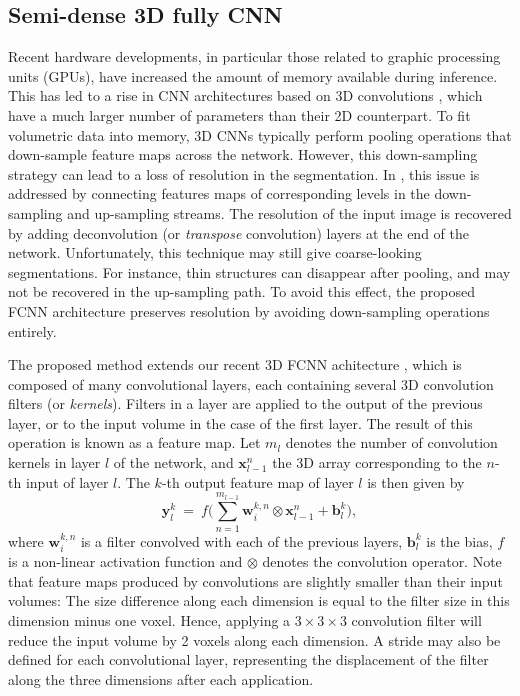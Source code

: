 \documentclass[twoside,espcrc2]{elsarticle}
\newcommand{\vold}[1]{$#1\!\times\!#1\!\times\!#1$}
\renewcommand{\vec}[1]{\mathbf{#1}}
\newcommand{\xx}{\vec x}
\newcommand{\yy}{\vec y}
\newcommand{\bb}{\vec b}
\newcommand{\WW}{\vec w}
\begin{document}
\subsection{Semi-dense 3D fully CNN}
\label{ssec:semi-dense}


Recent hardware developments, in particular those related to graphic processing units (GPUs), have increased the amount of memory available during inference. This has led to a rise in CNN architectures based on 3D convolutions \cite{kamnitsas2017efficient,dou20163d,milletari2016v,lu2017automatic}, which have a much larger number of parameters than their 2D counterpart. To fit volumetric data into memory, 3D CNNs typically perform pooling operations that down-sample feature maps across the network. However, this down-sampling strategy can lead to a loss of resolution in the segmentation. In \cite{long2015fully}, this issue is addressed by connecting features maps of corresponding levels in the down-sampling and up-sampling streams. The resolution of the input image is recovered by adding deconvolution (or \emph{transpose} convolution) layers at the end of the network. Unfortunately, this technique may still give coarse-looking segmentations. For instance, thin structures can disappear after pooling, and may not be recovered in the up-sampling path. To avoid this effect, the proposed FCNN architecture preserves resolution by avoiding down-sampling operations entirely. 

The proposed method extends our recent 3D FCNN achitecture \cite{DolzNeuro2017}, which is composed of many convolutional layers, each containing several 3D convolution filters (or \emph{kernels}). Filters in a layer are applied to the output of the previous layer, or to the input volume in the case of the first layer. The result of this operation is known as a feature map. Let $m_l$ denotes the number of convolution kernels in layer $l$ of the network, and $\xx^n_{l-1}$ the 3D array corresponding to the $n$-th input of layer $l$. The $k$-th output feature map of layer $l$ is then given by
\begin{equation}
    \yy^k_l \ = \ f\Big(\sum^{m_{l-1}}_{n=1} \WW^{k,n}_{i} \otimes \xx^n_{l-1} + \bb^{k}_{l}\Big),
\end{equation} 
where $\WW^{k,n}_{i}$ is a filter convolved with each of the previous layers, $\bb^{k}_{l}$ is the bias, $f$ is a non-linear activation function and $\otimes$ denotes the convolution operator. Note that feature maps produced by convolutions are slightly smaller than their input volumes: The size difference along each dimension is equal to the filter size in this dimension minus one voxel. Hence, applying a \vold{3} convolution filter will reduce the input volume by 2 voxels along each dimension. A stride may also be defined for each convolutional layer, representing the displacement of the filter along the three dimensions after each application.
\end{document}

